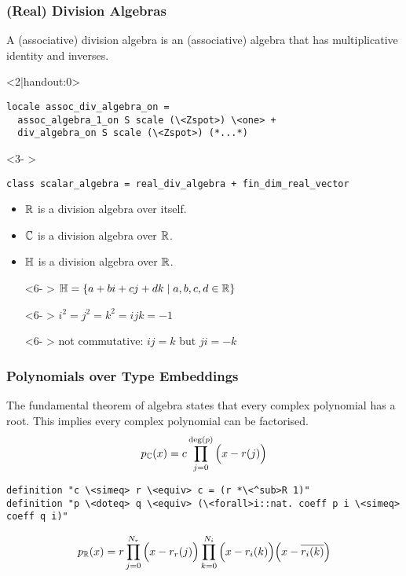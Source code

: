 \documentclass[12pt,notheorems,aspectratio=169,handout]{beamer} %
\begin{document}
\begin{frame}[fragile]\frametitle{(Real) Division Algebras}
A (associative) division algebra is an (associative) algebra that has multiplicative identity and inverses.
\pause

\begin{overlayarea}{\textwidth}{0.25\textheight}
\begin{onlyenv}<2|handout:0>
\begin{lstlisting}
locale assoc_div_algebra_on =
  assoc_algebra_1_on S scale (\<Zspot>) \<one> +
  div_algebra_on S scale (\<Zspot>) (*...*)
\end{lstlisting}
\end{onlyenv}

\begin{onlyenv}<3- >
\begin{lstlisting}
class scalar_algebra = real_div_algebra + fin_dim_real_vector
\end{lstlisting}
\end{onlyenv}
\end{overlayarea}
\pause[4]

\begin{minipage}{.47\textwidth}
\begin{example}
\begin{itemize}
\item<4- > ${\mathord{\mathbb R}}$ is a division algebra over itself.
\item<5- > ${\mathord{\mathbb C}}$ is a division algebra over ${\mathord{\mathbb R}}$.
\item<6- > ${\mathord{\mathbb H}}$ is a division algebra over ${\mathord{\mathbb R}}$.
\end{itemize}
\end{example}
\end{minipage}%
\hfill%
\begin{minipage}{.53\textwidth}
\begin{itemize}
\item[]<6- > ${\mathord{\mathbb H}} = \left\lbrace a+bi+cj+dk \;|\; a,b,c,d \in {\mathord{\mathbb R}} \right\rbrace$
\item[]<6- > $i^2 = j^2 = k^2 = ijk = -1$
\item[]<6- > not commutative: $ij = k$ but $ji = -k$
\end{itemize}
\end{minipage}
\end{frame}



\begin{frame}[fragile]\frametitle{Polynomials over Type Embeddings}
The fundamental theorem of algebra states that every complex polynomial has a root. This implies every complex polynomial can be factorised.
$$p_{\mathord{\mathbb C}}(x) = c \prod_{j=0}^{\mathrm{deg}(p)}\Big(x - r(j)\Big)$$

\begin{lstlisting}
definition "c \<simeq> r \<equiv> c = (r *\<^sub>R 1)"
definition "p \<doteq> q \<equiv> (\<forall>i::nat. coeff p i \<simeq> coeff q i)"
\end{lstlisting}

$$p_{\mathord{\mathbb R}}(x) = r \prod_{j=0}^{N_r}\Big(x - r_r(j)\Big) \prod_{k=0}^{N_i}\Big(x - r_i(k)\Big)\Big(x - \overline{r_i(k)}\Big)$$
\end{frame}
\end{document}
